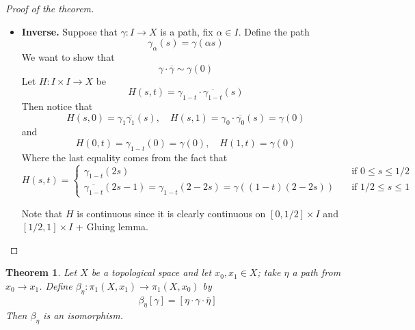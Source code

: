 \documentclass[11pt,a4paper]{article}
\theoremstyle{definition}
\theoremstyle{plain}
\newtheorem{theorem}[definition]{Theorem}
\theoremstyle{remark}
\newcommand{\1}{\mathbbm{1}}
\begin{document}
\begin{proof}[Proof of the theorem]
\begin{itemize}
        \item \textbf{Inverse.} Suppose that $\gamma \colon I \to X$ is a path, fix $\alpha \in I$. Define the path 
        $$\gamma_\alpha(s) = \gamma(\alpha s)$$
        We want to show that 
        $$\gamma \cdot \overline{\gamma} \sim \gamma(0)$$
        Let $H \colon I \times I \to X$ be 
        $$H(s,t) = \gamma_{1-t} \cdot \overline{\gamma_{1-t}} (s)$$
        Then notice that 
        $$H(s,0) = \gamma_1 \overline{\gamma_1} (s), \quad H(s, 1) = \gamma_0 \cdot \overline{\gamma_0} (s) = \gamma(0)$$
        and 
        $$H(0, t) = \gamma_{1-t} (0) = \gamma(0), \quad H(1,t) = \gamma(0)$$
        Where the last equality comes from the fact that 
        $$H(s,t) = \begin{cases}
            \gamma_{1-t} (2s) \quad &\text{if } 0 \le s \le 1/2 \\
            \overline{\gamma_{1-t}} (2s - 1) = \gamma_{1-t} (2 - 2s) = \gamma((1-t) (2-2s)) \quad &\text{if } 1/2 \le s \le 1
        \end{cases}$$

        Note that $H$ is continuous since it is clearly continuous on $[0,1/2] \times I$ and $[1/2, 1] \times I$ + Gluing lemma.
    \end{itemize}
\end{proof}

\begin{theorem}
    Let $X$ be a topological space and let $x_0, x_1 \in X$; take $\eta$ a path from $x_ 0 \to x_1$. 
    Define $\beta_\eta \colon \pi_1(X, x_1) \to \pi_1 (X, x_0)$ by 
    $$\beta_\eta [\gamma] = [\eta \cdot \gamma \cdot \overline{\eta}]$$
    Then $\beta_\eta$ is an isomorphism.
\end{theorem}
\end{document}

